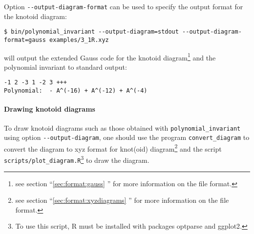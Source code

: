 Option \lstinline{--output-diagram-format} can be used to specify the output format for the knotoid diagram:
\begin{lstlisting}
$ bin/polynomial_invariant --output-diagram=stdout --output-diagram-format=gauss examples/3_1R.xyz
\end{lstlisting}
will output the extended Gauss code for the knotoid diagram\footnote{see section ``\ref{sec:format:gauss} '' for more information on the file format.} and the polynomial invariant to standard output:
\begin{lstlisting}
-1 2 -3 1 -2 3 +++
Polynomial:  - A^(-16) + A^(-12) + A^(-4)
\end{lstlisting}

\paragraph{Drawing knotoid diagrams}
To draw knotoid diagrams such as those obtained with \lstinline{polynomial_invariant} using option \lstinline{--output-diagram}, one should use the program \lstinline{convert_diagram} to convert the diagram to xyz format for knot(oid) diagram\footnote{see section ``\ref{sec:format:xyzdiagrams} '' for more information on the file format.} and the script \lstinline{scripts/plot_diagram.R}\footnote{To use this script, {\ttfamily R}\cite{r2017} must be installed with packages {\ttfamily optparse}\cite{optparse} and {\ttfamily ggplot2}\cite{wickham2009}.} to draw the diagram.

